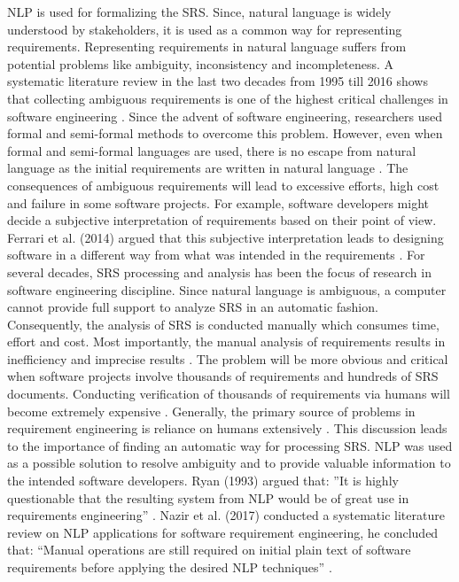 \begin{multicols*}{2}
	\gls{NLP} is used for formalizing the \gls{SRS}. Since, natural language is widely understood by stakeholders, it is used as a common way for representing requirements. Representing requirements in natural language suffers from potential problems like ambiguity, inconsistency and incompleteness. A systematic literature review in the last two decades from 1995 till 2016 shows that collecting ambiguous requirements is one of the highest critical challenges in software engineering \cite{Besrour}. Since the advent of software engineering, researchers used formal and semi-formal methods to overcome this problem. However, even when formal and semi-formal languages are used, there is no escape from natural language as the initial requirements are written in natural language \cite{Kamsties}. The consequences of ambiguous requirements will lead to excessive efforts, high cost and failure in some software projects. For example, software developers might decide a subjective interpretation of requirements based on their point of view. Ferrari et al. (2014) argued that this subjective interpretation leads to designing software in a different way from what was intended in the requirements \cite{Ferrari}. For several decades, \gls{SRS} processing and analysis has been the focus of research in software engineering discipline. Since natural language is ambiguous, a computer cannot provide full support to analyze \gls{SRS} in an automatic fashion. Consequently, the analysis of \gls{SRS} is conducted manually which consumes time, effort and cost. Most importantly, the manual analysis of requirements results in inefficiency and imprecise results \cite{Wang}. The problem will be more obvious and critical when software projects involve thousands of requirements and hundreds of \gls{SRS} documents. Conducting verification of thousands of requirements via humans will become extremely expensive \cite{Fanmuy}. Generally, the primary source of problems in requirement engineering is reliance on humans extensively \cite{Ahmed}. This discussion leads to the importance of finding an automatic way for processing \gls{SRS}. \gls{NLP} was used as a possible solution to resolve ambiguity and to provide valuable information to the intended software developers. Ryan (1993) argued that: ”It is highly questionable that the resulting system from \gls{NLP} would be of great use in requirements engineering” \cite{Ryan}. Nazir et al. (2017) conducted a systematic literature review on \gls{NLP} applications for software requirement engineering, he concluded that: “Manual operations are still required on initial plain text of software requirements before applying the desired \gls{NLP} techniques” \cite{Nazir}.
	

\end{multicols*}
